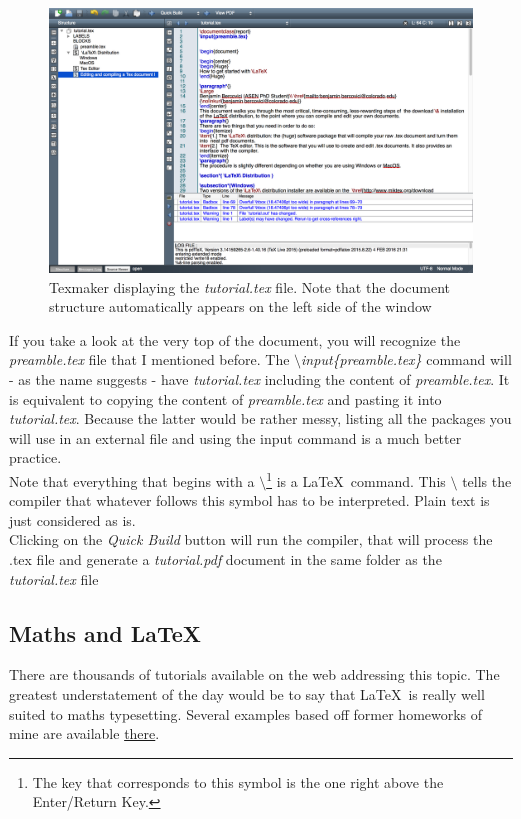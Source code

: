 \documentclass{report}
\begin{document}
\begin{figure}[H]
\centering
\includegraphics[scale=0.38]{opened_document}
\caption{Texmaker displaying the \textit{tutorial.tex} file. Note that the document structure automatically appears on the left side of the window}
\label{fig:opened_document}
\end{figure}
If you take a look at the very top of the document, you will recognize the \textit{preamble.tex} file that I mentioned before. The \textit{$\setminus$input\{preamble.tex\}} command will - as the name suggests - have \textit{tutorial.tex} including the content of \textit{preamble.tex}. It is equivalent to copying the content of \textit{preamble.tex} and pasting it into \textit{tutorial.tex}. Because the latter would be rather messy, listing all the packages you will use in an external file and using the input command is a much better practice.\\

Note that everything that begins with a $\setminus$\footnote{The key that corresponds to this symbol is the one right above the Enter/Return Key.} is a \LaTeX\ command. This $\setminus$ tells the compiler that whatever follows this symbol has to be interpreted. Plain text is just considered as is. \\
Clicking on the \textit{Quick Build} button will run the compiler, that will process the .tex file and generate a \textit{tutorial.pdf} document in the same folder as the \textit{tutorial.tex} file

\subsection{Maths and \LaTeX }
There are thousands of tutorials available on the web addressing this topic. The greatest understatement of the day would be to say that \LaTeX\ is really well suited to maths typesetting. Several examples based off former homeworks of mine are available \href{https://drive.google.com/file/d/0Bzf79yzZcPJJSnJKOFdrLVhtSG8/view?usp=sharing}{there}.
\end{document}
